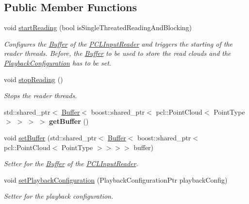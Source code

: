 \subsection*{Public Member Functions}
\begin{DoxyCompactItemize}
\item 
void \hyperlink{class_p_c_l_input_reader_a6e22e7edb9816b95e33affe189706884}{start\+Reading} (bool is\+Single\+Threated\+Reading\+And\+Blocking)
\begin{DoxyCompactList}\small\item\em Configures the \hyperlink{class_buffer}{Buffer} of the \hyperlink{class_p_c_l_input_reader}{P\+C\+L\+Input\+Reader} and triggers the starting of the reader threads. Before, the \hyperlink{class_buffer}{Buffer} to be used to store the read clouds and the \hyperlink{class_playback_configuration}{Playback\+Configuration} has to be set. \end{DoxyCompactList}\item 
\hypertarget{class_p_c_l_input_reader_a036d43c8d667bad9172af9ad9f98ee42}{}void \hyperlink{class_p_c_l_input_reader_a036d43c8d667bad9172af9ad9f98ee42}{stop\+Reading} ()\label{class_p_c_l_input_reader_a036d43c8d667bad9172af9ad9f98ee42}

\begin{DoxyCompactList}\small\item\em Stops the reader threads. \end{DoxyCompactList}\item 
\hypertarget{class_p_c_l_input_reader_ab9627afde1090418fd35db144e7a612f}{}std\+::shared\+\_\+ptr$<$ \hyperlink{class_buffer}{Buffer}$<$ boost\+::shared\+\_\+ptr$<$ pcl\+::\+Point\+Cloud$<$ Point\+Type $>$ $>$ $>$ $>$ {\bfseries get\+Buffer} ()\label{class_p_c_l_input_reader_ab9627afde1090418fd35db144e7a612f}

\item 
void \hyperlink{class_p_c_l_input_reader_a7457aaa810319d498c992403707252e6}{set\+Buffer} (std\+::shared\+\_\+ptr$<$ \hyperlink{class_buffer}{Buffer}$<$ boost\+::shared\+\_\+ptr$<$ pcl\+::\+Point\+Cloud$<$ Point\+Type $>$$>$$>$$>$ buffer)
\begin{DoxyCompactList}\small\item\em Setter for the \hyperlink{class_buffer}{Buffer} of the \hyperlink{class_p_c_l_input_reader}{P\+C\+L\+Input\+Reader}. \end{DoxyCompactList}\item 
void \hyperlink{class_p_c_l_input_reader_ad65cbfccd8aaf6560e4c334891ca17da}{set\+Playback\+Configuration} (Playback\+Configuration\+Ptr playback\+Config)
\begin{DoxyCompactList}\small\item\em Setter for the playback configuration. \end{DoxyCompactList}\end{DoxyCompactItemize}

